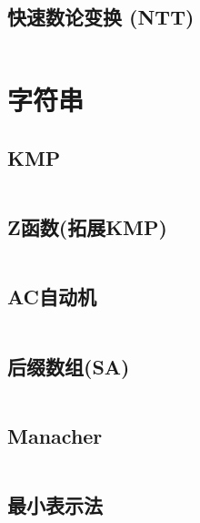 \documentclass[twoside,twocolumn]{article}
\begin{document}
\subsection{快速数论变换 (NTT)}
\inputminted[breaklines, frame=single]{c++}{../algo/数学/NTT.cpp}

\section{字符串}

\subsection{KMP}
\inputminted[breaklines, frame=single]{c++}{../algo/字符串/KMP.cpp}

\subsection{Z函数(拓展KMP)}
\inputminted[breaklines, frame=single]{c++}{../algo/字符串/Z函数.cpp}


\subsection{AC自动机}
\inputminted[breaklines, frame=single]{c++}{../algo/字符串/AC自动机.cpp}


\subsection{后缀数组(SA)}
\inputminted[breaklines, frame=single]{c++}{../algo/字符串/SA.cpp}

\subsection{Manacher}
\inputminted[breaklines, frame=single]{c++}{../algo/字符串/manacher.cpp}

\subsection{最小表示法}
\inputminted[breaklines, frame=single]{c++}{../algo/字符串/最小表示法.cpp}


\end{document}
